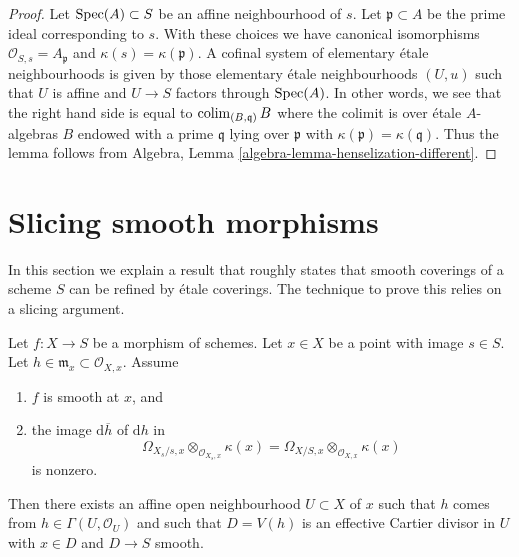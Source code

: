 \begin{proof}
Let $\mathop{\rm Spec}(A) \subset S$ be an affine neighbourhood of $s$.
Let $\mathfrak p \subset A$ be the prime ideal corresponding to $s$.
With these choices we have canonical isomorphisms
$\mathcal{O}_{S, s} = A_{\mathfrak p}$ and $\kappa(s) = \kappa(\mathfrak p)$.
A cofinal system of elementary \'etale neighbourhoods is given by those
elementary \'etale neighbourhoods $(U, u)$ such that $U$ is affine and
$U \to S$ factors through $\mathop{\rm Spec}(A)$. In other words, we see that
the right hand side is equal to $\mathop{\rm colim}\nolimits_{(B, \mathfrak q)} B$
where the colimit is over \'etale $A$-algebras $B$ endowed with a prime
$\mathfrak q$ lying over $\mathfrak p$ with
$\kappa(\mathfrak p) = \kappa(\mathfrak q)$.
Thus the lemma follows from
Algebra, Lemma \ref{algebra-lemma-henselization-different}.
\end{proof}




\section{Slicing smooth morphisms}
\label{section-etale-over-smooth}

\noindent
In this section we explain a result that roughly states that
smooth coverings of a scheme $S$ can be refined by \'etale coverings.
The technique to prove this relies on a slicing argument.

\begin{lemma}
\label{lemma-slice-smooth-given-element}
Let $f : X \to S$ be a morphism of schemes.
Let $x \in X$ be a point with image $s \in S$.
Let $h \in \mathfrak m_x \subset \mathcal{O}_{X, x}$.
Assume
\begin{enumerate}
\item $f$ is smooth at $x$, and
\item the image $\text{d}\overline{h}$ of $\text{d}h$ in
$$
\Omega_{X_s/s, x} \otimes_{\mathcal{O}_{X_s, x}} \kappa(x) =
\Omega_{X/S, x} \otimes_{\mathcal{O}_{X, x}} \kappa(x)
$$
is nonzero.
\end{enumerate}
Then there exists an affine open neighbourhood $U \subset X$ of $x$
such that $h$ comes from $h \in \Gamma(U, \mathcal{O}_U)$ and such
that $D = V(h)$ is an effective Cartier divisor in $U$ with $x \in D$ and
$D \to S$ smooth.
\end{lemma}

